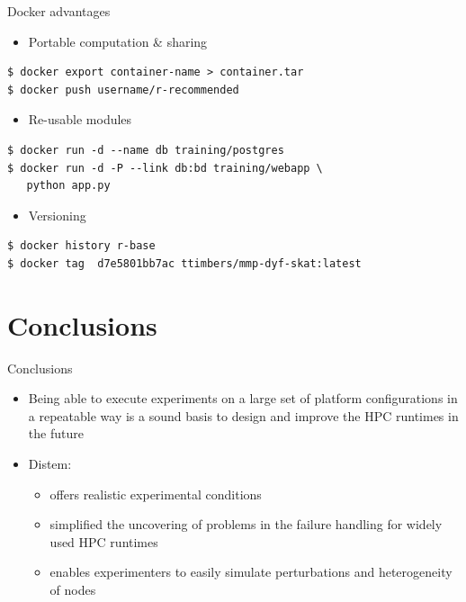 \documentclass[11pt,xcolor=dvipsnames,presentation]{beamer}
\begin{document}
\begin{frame}[fragile,label=sec-5-0-2]{Docker advantages}
 \begin{itemize}
\item Portable computation \& sharing
\end{itemize}

\begin{verbatim}
$ docker export container-name > container.tar
$ docker push username/r-recommended
\end{verbatim}

\begin{itemize}
\item Re-usable modules
\end{itemize}
\begin{verbatim}
$ docker run -d --name db training/postgres
$ docker run -d -P --link db:bd training/webapp \
   python app.py
\end{verbatim}

\begin{itemize}
\item Versioning
\end{itemize}

\begin{verbatim}
$ docker history r-base
$ docker tag  d7e5801bb7ac ttimbers/mmp-dyf-skat:latest
\end{verbatim}
\end{frame}

\section{Conclusions}
\label{sec-6}

\begin{frame}[label=sec-6-0-1]{Conclusions}
\begin{itemize}
\item Being able to execute experiments on a large set of platform
configurations in a repeatable way is a sound basis to design
and improve the HPC runtimes in the future
\end{itemize}

\vspace{0.5cm}
\begin{itemize}
\item \alert{Distem:}
\begin{itemize}
\item offers realistic experimental conditions

\item simplified the uncovering of problems in the
failure handling for widely used HPC runtimes

\item enables experimenters to easily simulate perturbations and
heterogeneity of nodes
\end{itemize}
\end{itemize}
\end{frame}
\end{document}

